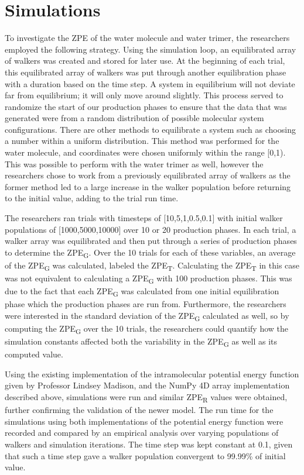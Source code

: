 \documentclass[journal=jacsat,manuscript=article]{achemso}
\begin{document}
\section{Simulations}

To investigate the ZPE of the water molecule and water trimer, the researchers employed the following strategy. Using the simulation loop, an equilibrated array of walkers was created and stored for later use. At the beginning of each trial, this equilibrated array of walkers was put through another equilibration phase with a duration based on the time step. A system in equilibrium will not deviate far from equilibrium; it will only move around slightly. This process served to randomize the start of our production phases to ensure that the data that was generated were from a random distribution of possible molecular system configurations. There are other methods to equilibrate a system such as choosing a number within a uniform distribution. This method was performed for the water molecule, and coordinates were chosen uniformly within the range [0,1). This was possible to perform with the water trimer as well\cite{Roinou2020}, however the researchers chose to work from a previously equilibrated array of walkers as the former method led to a large increase in the walker population before returning to the initial value, adding to the trial run time. 

The researchers ran trials with timesteps of [10,5,1,0.5,0.1] with initial walker populations of [1000,5000,10000] over 10 or 20 production phases. In each trial, a walker array was equilibrated and then put through a series of production phases to determine the ZPE\textsubscript{G}. Over the 10 trials for each of these variables, an average of the ZPE\textsubscript{G} was calculated, labeled the ZPE\textsubscript{T}. Calculating the ZPE\textsubscript{T} in this case was not equivalent to calculating a ZPE\textsubscript{G} with 100 production phases. This was due to the fact that each ZPE\textsubscript{G} was calculated from one initial equilibration phase which the production phases are run from. Furthermore, the researchers were interested in the standard deviation of the ZPE\textsubscript{G} calculated as well, so by computing the ZPE\textsubscript{G} over the 10 trials, the researchers could quantify how the simulation constants affected both the variability in the ZPE\textsubscript{G} as well as its computed value.

Using the existing implementation of the intramolecular potential energy function given by Professor Lindsey Madison, and the NumPy 4D array implementation described above, simulations were run and similar ZPE\textsubscript{R} values were obtained, further confirming the validation of the newer model. The run time for the simulations using both implementations of the potential energy function were recorded and compared by an empirical analysis over varying populations of walkers and simulation iterations. The time step was kept constant at 0.1, given that such a time step gave a walker population convergent to 99.99\% of initial value.
\end{document}
